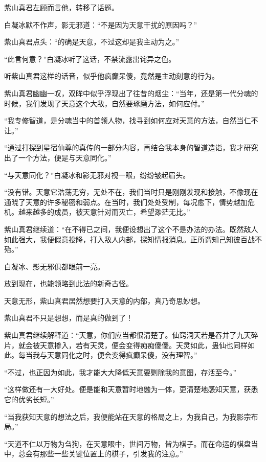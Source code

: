 
\begin{this_body}

紫山真君左顾而言他，转移了话题。

白凝冰默不作声，影无邪道：“不是因为天意干扰的原因吗？”

紫山真君点头：“的确是天意，不过这却是我主动为之。”

“此言何意？”白凝冰听了这话，不禁流露出诧异之色。

听紫山真君这样的话音，似乎他疯癫呆傻，竟然是主动刻意的行为。

紫山真君幽幽一叹，双眸中似乎浮现出了往昔的烟尘：“当年，还是第一代分魂的时候，我们发现了天意这个大敌，自然要琢磨方法，如何应付。”

“我专修智道，是分魂当中的首领人物，找寻到如何应对天意的方法，自然当仁不让。”

“通过打探到星宿仙尊的真传的一部分内容，再结合我本身的智道造诣，我才研究出了一个方法，便是与天意同化。”

“与天意同化？”白凝冰和影无邪对视一眼，纷纷皱起眉头。

“没有错。天意它浩荡无穷，无处不在，我们当时只是刚刚发现和接触，不像现在通晓了天意的许多秘密和弱点。在当时，我们处处受制，每况愈下，情势越加危机。越来越多的成员，被天意针对而灭亡，希望渺茫无比。”

紫山真君继续道：“在不得已之间，我便设想出了这个不是办法的办法。既然敌人如此强大，我便假意投降，打入敌人内部，探知情报消息。正所谓知己知彼百战不殆。”

白凝冰、影无邪俱都眼前一亮。

放到现在，也能领略到此法的新奇古怪。

天意无形，紫山真君居然想要打入天意的内部，真乃奇思妙想。

紫山真君不只是想想，而是真的做到了！

紫山真君继续解释道：“天意，你们应当都很清楚了。仙窍洞天若是吞并了九天碎片，就会被天意掺入，若有天灵，便会变得痴痴傻傻。天灵如此，蛊仙也同样如此。每当我与天意同化之时，便会变得疯癫呆傻，没有理智。”

“不过，也正因为如此，我才能大大降低天意要剿除我的意图，存活至今。”

“这样做还有一大好处。便是能和天意暂时地融为一体，更清楚地感知天意，获悉它的优劣长短。”

“当我获知天意的想法之后，我便能站在天意的格局之上，为我自己，为我影宗布局。”

“天道不仁以万物为刍狗，在天意眼中，世间万物，皆为棋子。而在命运的棋盘当中，总会有那些一些关键位置上的棋子，引发我的注意。”


\end{this_body}
